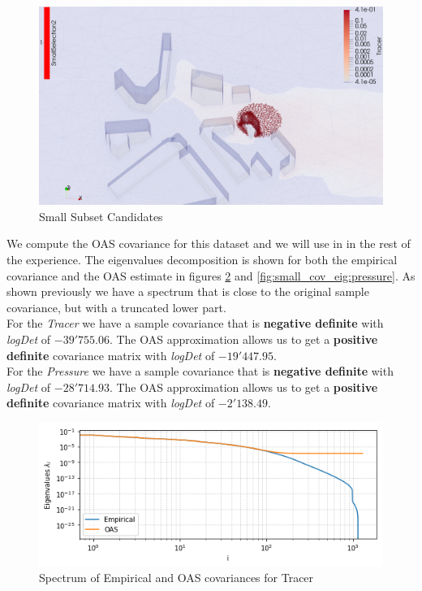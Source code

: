 \begin{figure}[h!]
\centering
    \includegraphics[width=0.8\linewidth]{figures/CompAlg/3rd/non_centered_60.35.0/candidates_screenshot}
    \caption{Small Subset Candidates}
    \label{fig:smallset:position}
\end{figure}

We compute the OAS covariance for this dataset and we will use in in the rest of the experience. The eigenvalues decomposition is shown for both the empirical covariance and the OAS estimate in figures \ref{fig:small_cov_eig:tracer} and \ref{fig:small_cov_eig:pressure}. As shown previously we have a spectrum that is close to the original sample covariance, but with a truncated lower part. \\

For the \textit{Tracer} we have a sample covariance that is \textbf{negative definite} with \textit{logDet} of $-39'755.06$. The OAS approximation allows us to get a \textbf{positive definite} covariance matrix with \textit{logDet} of $-19'447.95$.  \\

For the \textit{Pressure} we have a sample covariance that is \textbf{negative definite} with \textit{logDet} of $-28'714.93$. The OAS approximation allows us to get a \textbf{positive definite} covariance matrix with \textit{logDet} of $-2'138.49$.  \\

\begin{figure}[h!]
\centering
    \includegraphics[width=0.7\linewidth]{figures/CompAlg/covarianceEmpOAS}
    \caption{Spectrum of Empirical and OAS covariances for Tracer}
    \label{fig:small_cov_eig:tracer}
\end{figure}


